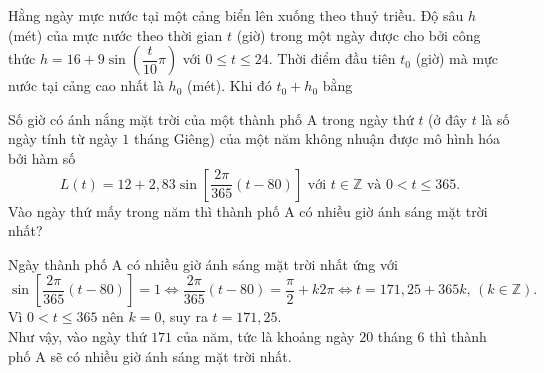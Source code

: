 \begin{bt}%

	Hằng ngày mực nước tại một cảng biển lên xuống theo thuỷ triều. Độ sâu $h$ (mét) của mực nước theo thời gian $t$ (giờ) trong một ngày được cho bởi công thức $h=16 + 9\sin\left( \dfrac{t}{10}\pi \right)$ với $0\leq t\leq 24$. Thời điểm đầu tiên $t_0$ (giờ) mà mực nước tại cảng cao nhất là $h_0$ (mét). Khi đó $t_0 + h_0$ bằng
\end{bt}

\begin{bt}%

	Số giờ có ánh nắng mặt trời của một thành phố A trong ngày thứ $t$ (ở đây $t$ là số ngày tính từ ngày $1$ tháng Giêng) của một năm không nhuận được mô hình hóa bởi hàm số
	$$L(t)=12+2{,}83\sin\left[\dfrac{2\pi}{365}(t-80)\right]\text{ với } t\in \mathbb{Z} \text{ và } 0<t\le 365.$$
	Vào ngày thứ mấy  trong năm thì thành phố A có nhiều giờ ánh sáng mặt trời nhất?
	
	\loigiai 
	{
		Ngày thành phố A có nhiều giờ ánh sáng mặt trời nhất ứng với 
		$$\sin\left[\dfrac{2\pi}{365}(t-80)\right]=1\Leftrightarrow\dfrac{2\pi}{365}(t-80)=\dfrac{\pi}{2}+k2\pi\Leftrightarrow t=171{,}25+365k,\,(k\in\mathbb{Z}).$$
		Vì $0<t\le 365$ nên $k=0$, suy ra $t=171{,}25$.\\
		Như vậy, vào ngày thứ $171$ của năm, tức là khoảng ngày $20$ tháng $6$ thì thành phố A sẽ có nhiều giờ ánh sáng mặt trời nhất.
	}
\end{bt}

